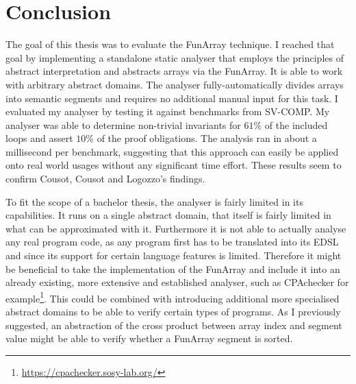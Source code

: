 \chapter{Conclusion}\label{chap:conclusion}

The goal of this thesis was to evaluate the FunArray technique. I reached that goal by implementing a standalone static analyser that employs the principles of abstract interpretation and abstracts arrays via the FunArray. It is able to work with arbitrary abstract domains. The analyser fully-automatically divides arrays into semantic segments and requires no additional manual input for this task.
I evaluated my analyser by testing it against benchmarks from SV-COMP. My analyser was able to determine non-trivial invariants for $61\%$ of the included loops and assert $10\%$ of the proof obligations. The analysis ran in about a millisecond per benchmark, suggesting that this approach can easily be applied onto real world usages without any significant time effort. These results seem to confirm Cousot, Cousot and Logozzo's findings.

To fit the scope of a bachelor thesis, the analyser is fairly limited in its capabilities. It runs on a single abstract domain, that itself is fairly limited in what can be approximated with it. Furthermore it is not able to actually analyse any real program code, as any program first has to be translated into its EDSL and since its support for certain language features is limited. Therefore it might be beneficial to take the implementation of the FunArray and include it into an already existing, more extensive and established analyser, such as CPAchecker for example\footnote{\url{https://cpachecker.sosy-lab.org/}}.
This could be combined with introducing additional more specialised abstract domains to be able to verify certain types of programs. As I previously suggested, an abstraction of the cross product between array index and segment value might be able to verify whether a FunArray segment is sorted.

